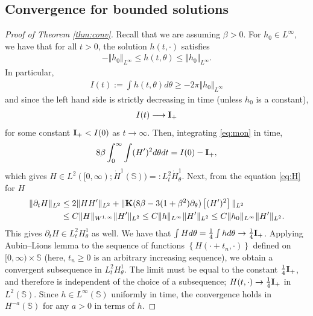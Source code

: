 \documentclass[10pt]{article}
\theoremstyle{definition}
\theoremstyle{remark}
\numberwithin{equation}{section}
\newcommand{\nrm}[1]{\Vert#1\Vert}
\newcommand{\rd}{\partial}
\newcommand{\0}{\emptyset}
\newcommand{\bt}{\beta}
\newcommand{\tht}{\theta}
\newcommand{\bfI}{{\bf I}}
\newcommand{\bfK}{{\bf K}}
\newcommand{\bbS}{\mathbb S}
\begin{document}
	
	\subsection{Convergence for bounded solutions}

 \begin{proof}[Proof of Theorem \ref{thm:conv}]
	Recall that we are assuming $\bt>0$. For $h_0 \in L^\infty$, we have that for all $t>0$, the solution $h(t,\cdot)$ satisfies \begin{equation*}
		\begin{split}
			-\nrm{h_0}_{L^\infty} \le h(t,\tht) \le \nrm{h_0}_{L^\infty}. 
		\end{split}
	\end{equation*} In particular, \begin{equation*}
		\begin{split}
			I(t) := \int h(t,\tht) d\tht \ge -2\pi\nrm{h_0}_{L^\infty}  
		\end{split}
	\end{equation*} and since the left hand side is strictly decreasing in time (unless $h_0$ is a constant), \begin{equation*}
		\begin{split}
			I(t) \longrightarrow \bfI_{+}
		\end{split}
	\end{equation*} for some constant $\bfI_{+} < I(0)$ as $t\to\infty$. Then, integrating \eqref{eq:mon} in time, \begin{equation*}
		\begin{split}
			8\bt\int_0^\infty \int (H')^2 d\tht dt = I(0) - \bfI_{+},
		\end{split}
	\end{equation*} which gives $H \in L^2([0,\infty); \dot{H}^1(\bbS)) =: L^2_t \dot{H}^1_\tht$.  Next, from the equation \eqref{eq:H} for $H$  \begin{equation*}
		\begin{split}
			\nrm{\rd_tH}_{L^2} &\le  2\nrm{H H'}_{L^2} + \nrm{\bfK(8\bt - 3(1+\bt^2)\rd_\tht)\left[ (H')^2  \right]}_{L^2} \\
			&\le C \nrm{H}_{W^{1,\infty}} \nrm{H'}_{L^2} \le C \nrm{h}_{L^\infty} \nrm{H'}_{L^2} \le C \nrm{h_0}_{L^{\infty}} \nrm{H'}_{L^2}. 
		\end{split}
	\end{equation*} This gives $\rd_tH \in L^2_tH^1_\tht$ as well. We have that $\int H d\tht = \frac14 \int h d\tht \to \frac14 \bfI_{+}$. Applying Aubin--Lions lemma to the sequence of functions $\left\{ H(\cdot+t_n, \cdot) \right\}$ defined on $[0,\infty)\times\bbS$ (here, $t_n\ge0 $ is an arbitrary increasing sequence), we obtain a convergent subsequence in $L^2_tH^1_\tht$. The limit must be equal to the constant $\frac14 \bfI_{+}$, and therefore is independent of the choice of a subsequence; $H(t,\cdot)\to \frac14 \bfI_{+}$ in $L^2(\bbS)$. Since $h\in L^\infty(\bbS)$ uniformly in time, the convergence holds in $H^{-a}(\bbS)$ for any $a>0$ in terms of $h$. \end{proof}
\end{document}
